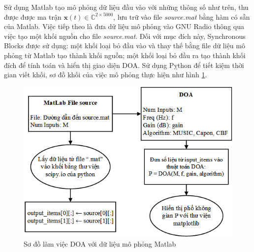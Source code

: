 Sử dụng Matlab tạo mô phỏng dữ liệu đầu vào với những thông số như trên, thu được được ma trận $\mathbf{x}(t) \in \mathbb{C}^{2 \times 5000}$, lưu trữ vào file \textit{source.mat} bằng hàm có sẵn của Matlab. Việc tiếp theo là đưa dữ liệu mô phỏng vào GNU Radio thông qua việc tạo một khối nguồn cho file \textit{source.mat}. Đối với mục đích này, Synchronous Blocks được sử dụng: một khối loại bỏ đầu vào và thay thế bằng file dữ liệu mô phỏng từ Matlab tạo thành khối nguồn; một khối loại bỏ đầu ra tạo thành khối đích để tính toán và hiển thị giao diện DOA. Sử dụng Pỵthon để tiết kiệm thời gian viết khối, sơ đồ khối của việc mô phỏng thực hiện như hình \ref{fig:simulation}.
\begin{figure} [h]
	\centering
	\includegraphics[width=0.8\linewidth]{figures/simulation.png}
	\caption{Sơ đồ làm việc DOA với dữ liệu mô phỏng Matlab}
	\label{fig:simulation}
\end{figure}

